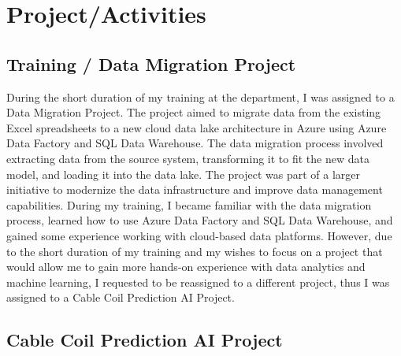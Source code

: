 \chapter{Project/Activities}
\label{ch:project}

\section{Training / Data Migration Project}

During the short duration of my training at the department, I was assigned to a
Data Migration Project. The project aimed to migrate data from the existing
Excel spreadsheets to a new cloud data lake architecture in Azure using Azure
Data Factory and SQL Data Warehouse. The data migration process involved
extracting data from the source system, transforming it to fit the new data
model, and loading it into the data lake. The project was part of a larger
initiative to modernize the data infrastructure and improve data management
capabilities. During my training, I became familiar with the data migration
process, learned how to use Azure Data Factory and SQL Data Warehouse, and
gained some experience working with cloud-based data platforms. However, due to
the short duration of my training and my wishes to focus on a project that
would allow me to gain more hands-on experience with data analytics and machine
learning, I requested to be reassigned to a different project, thus I was
assigned to a Cable Coil Prediction AI Project.

\section{Cable Coil Prediction AI Project}

